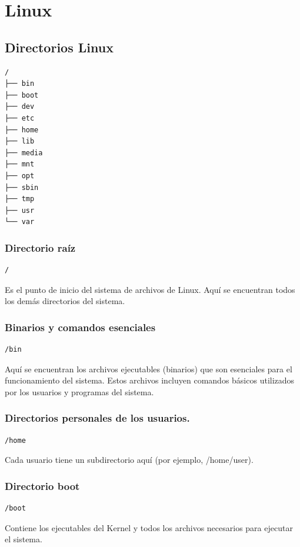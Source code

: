 \chapter{Linux}

\newpage

\section{Directorios Linux}

\begin{lstlisting}
/
├── bin
├── boot
├── dev
├── etc
├── home
├── lib
├── media
├── mnt
├── opt
├── sbin
├── tmp
├── usr
└── var
\end{lstlisting}
\subsection{Directorio raíz}
\begin{lstlisting}
/
\end{lstlisting}
Es el punto de inicio del sistema de archivos de Linux. Aquí se encuentran todos los demás directorios del sistema.

\subsection{Binarios y comandos esenciales}
\begin{lstlisting}
/bin
\end{lstlisting}
Aquí se encuentran los archivos ejecutables (binarios) que son esenciales para el funcionamiento del sistema. Estos archivos incluyen comandos básicos utilizados por los usuarios y programas del sistema.

\subsection{Directorios personales de los usuarios.}
\begin{lstlisting}
/home
\end{lstlisting}
Cada usuario tiene un subdirectorio aquí (por ejemplo, /home/user).

\newpage

\subsection{Directorio boot}
\begin{lstlisting}
/boot
\end{lstlisting}
Contiene los ejecutables del Kernel y todos los archivos necesarios para ejecutar el sistema.

